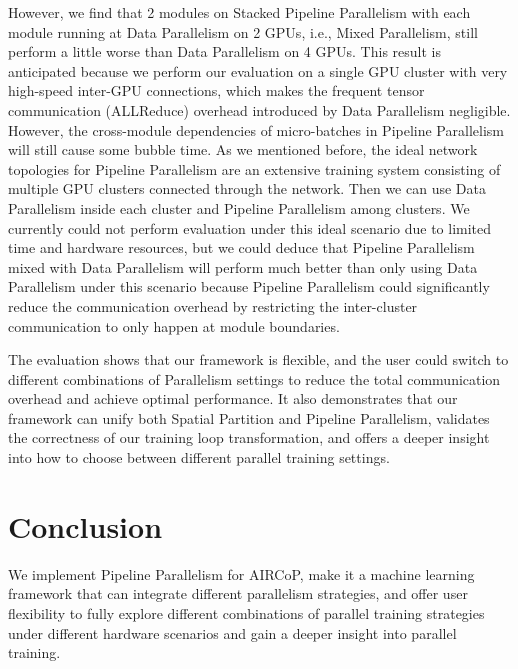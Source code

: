 \documentclass[sigplan, nonacm]{acmart}\settopmatter{printfolios=true,printccs=false,printacmref=false}
\begin{document}
However, we find that 2 modules on Stacked Pipeline Parallelism with each module running at Data Parallelism on 2 GPUs, i.e., Mixed Parallelism, still perform a little worse than Data Parallelism on 4 GPUs. This result is anticipated because we perform our evaluation on a single GPU cluster with very high-speed inter-GPU connections, which makes the frequent tensor communication (ALLReduce) overhead introduced by Data Parallelism negligible. However, the cross-module dependencies of micro-batches in Pipeline Parallelism will still cause some bubble time. As we mentioned before, the ideal network topologies for Pipeline Parallelism are an extensive training system consisting of multiple GPU clusters connected through the network. Then we can use Data Parallelism inside each cluster and Pipeline Parallelism among clusters. We currently could not perform evaluation under this ideal scenario due to limited time and hardware resources, but we could deduce that Pipeline Parallelism mixed with Data Parallelism will perform much better than only using Data Parallelism under this scenario because Pipeline Parallelism could significantly reduce the communication overhead by restricting the inter-cluster communication to only happen at module boundaries.\par
 The evaluation shows that our framework is flexible, and the user could switch to different combinations of Parallelism settings to reduce the total communication overhead and achieve optimal performance. It also demonstrates that our framework can unify both Spatial Partition and Pipeline Parallelism, validates the correctness of our training loop transformation, and offers a deeper insight into how to choose between different parallel training settings.
 \section{Conclusion} \label{conclusion}
We implement Pipeline Parallelism for AIRCoP, make it a machine learning framework that can integrate different parallelism strategies, and offer user flexibility to fully explore different combinations of parallel training strategies under different hardware scenarios and gain a deeper insight into parallel training.


\end{document}
